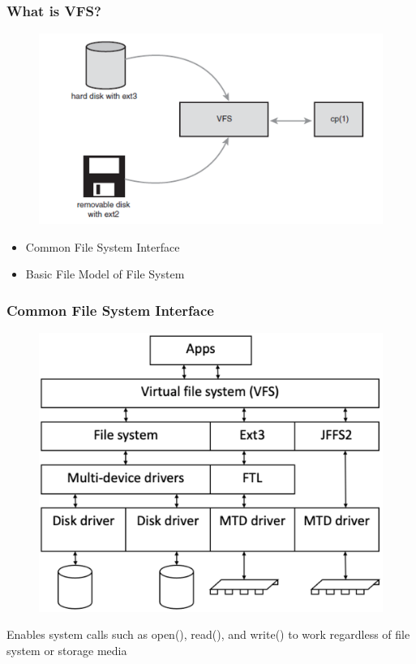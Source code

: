 % 
\begin{frame}[fragile]
    \frametitle{What is VFS?}

% 
  \begin{figure}
    \centering
    \includegraphics[width=0.5\linewidth]{figs/vfs-example.png}
	\end{figure}

	    \begin{itemize}
	        \item Common File System Interface
	        \item Basic File Model of File System
	    \end{itemize}
% 
\end{frame}
\begin{frame}[fragile]
    \frametitle{Common File System Interface}

% 
  \begin{figure}
    \centering
    \includegraphics[width=0.4\linewidth]{figs/vfs-interface.png}
	\end{figure}


% 
Enables system calls such as open(), read(), and write() to work regardless of file system or storage media
% 
\end{frame}
